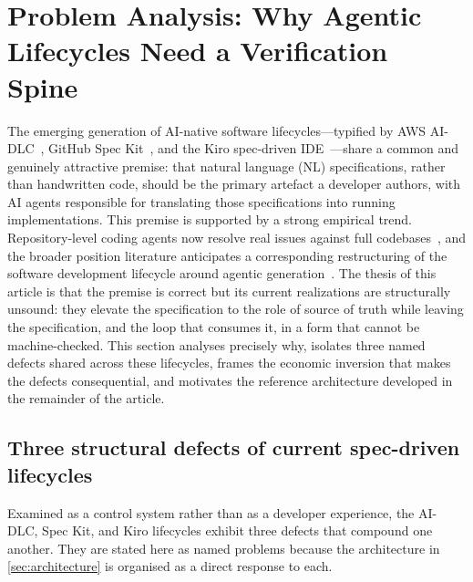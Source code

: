 \section{Problem Analysis: Why Agentic Lifecycles Need a Verification Spine}
\label{sec:motivation}

The emerging generation of AI-native software lifecycles---typified by AWS AI-DLC~\cite{awsaidlc}, GitHub Spec Kit~\cite{githubspeckit}, and the Kiro spec-driven IDE~\cite{awskiro}---share a common and genuinely attractive premise: that natural language (NL) specifications, rather than handwritten code, should be the primary artefact a developer authors, with AI agents responsible for translating those specifications into running implementations. This premise is supported by a strong empirical trend. Repository-level coding agents now resolve real issues against full codebases~\cite{jimenez2024swebench,yang2024sweagent,zhang2024autocoderover}, and the broader position literature anticipates a corresponding restructuring of the software development lifecycle around agentic generation~\cite{ozkaya2023llmse,liu2024llmagentse}. The thesis of this article is that the premise is correct but its current realizations are structurally unsound: they elevate the specification to the role of source of truth while leaving the specification, and the loop that consumes it, in a form that cannot be machine-checked. This section analyses precisely why, isolates three named defects shared across these lifecycles, frames the economic inversion that makes the defects consequential, and motivates the reference architecture developed in the remainder of the article.

\subsection{Three structural defects of current spec-driven lifecycles}
\label{subsec:three-defects}

Examined as a control system rather than as a developer experience, the AI-DLC, Spec Kit, and Kiro lifecycles exhibit three defects that compound one another. They are stated here as named problems because the architecture in \cref{sec:architecture} is organised as a direct response to each.

